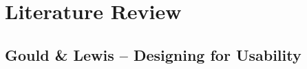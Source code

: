 \documentclass[11pt,a4paper]{report}
\begin{document}

\clearpage\maketitle
\thispagestyle{empty}

\newpage
\tableofcontents{}
\thispagestyle{empty}


\newpage

\chapter{Literature Review}

\section{Gould \& Lewis -- Designing for Usability}
\end{document}

